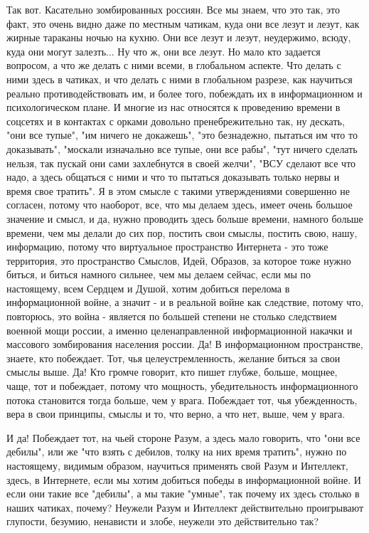 Так вот. Касательно зомбированных россиян. Все мы знаем, что это так, это факт,
это очень видно даже по местным чатикам, куда они все лезут и лезут, как жирные
тараканы ночью на кухню. Они все лезут и лезут, неудержимо, всюду, куда они
могут залезть...  Ну что ж, они все лезут. Но мало кто задается вопросом, а что
же делать с ними всеми, в глобальном аспекте. Что делать с ними здесь в
чатиках, и что делать с ними в глобальном разрезе, как научиться реально
противодействовать им, и более того, побеждать их в информационном и
психологическом плане.  И многие из нас относятся к проведению времени в
соцсетях и в контактах с орками довольно пренебрежительно так, ну дескать, "они
все тупые", "им ничего не докажешь", "это безнадежно, пытаться им что то
доказывать", "москали изначально все тупые, они все рабы", "тут ничего сделать
нельзя, так пускай они сами захлебнутся в своей желчи", "ВСУ сделают все что
надо, а здесь общаться с ними и что то пытаться доказывать только нервы и время
свое тратить". Я в этом смысле с такими утверждениями совершенно не согласен,
потому что наоборот, все, что мы делаем здесь, имеет очень большое значение и
смысл, и да, нужно проводить здесь больше времени, намного больше времени, чем
мы делали до сих пор, постить свои смыслы, постить свою, нашу, информацию,
потому что виртуальное пространство Интернета - это тоже территория, это
пространство Смыслов, Идей, Образов, за которое тоже нужно биться, и биться
намного сильнее, чем мы делаем сейчас, если мы по настоящему, всем Сердцем и
Душой, хотим добиться перелома в информационной войне, а значит - и в реальной
войне как следствие, потому что, повторюсь, это война - является по большей
степени не столько следствием военной мощи россии, а именно целенаправленной
информационной накачки и массового зомбирования населения россии. Да! В
информационном пространстве, знаете, кто побеждает. Тот, чья
целеустремленность, желание биться за свои смыслы выше. Да! Кто громче говорит,
кто пишет глубже, больше, мощнее, чаще, тот и побеждает, потому что мощность,
убедительность информационного потока становится тогда больше, чем у врага.
Побеждает тот, чья убежденность, вера в свои принципы, смыслы и то, что верно,
а что нет, выше, чем у врага.

И да! Побеждает тот, на чьей стороне Разум, а здесь мало говорить, что "они все
дебилы", или же "что взять с дебилов, толку на них время тратить", нужно по
настоящему, видимым образом, научиться применять свой Разум и Интеллект, здесь,
в Интернете, если мы хотим добиться победы в информационной войне. И если они
такие все "дебилы", а мы такие "умные", так почему их здесь столько в наших
чатиках, почему? Неужели Разум и Интеллект действительно проигрывают глупости,
безумию, ненависти и злобе, неужели это действительно так?

